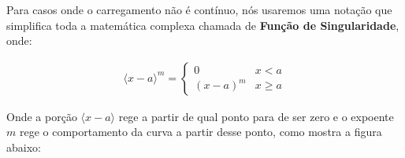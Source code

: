 \documentclass{article}
\begin{document}
            Para casos onde o carregamento não é contínuo, nós usaremos uma notação que simplifica toda a matemática complexa chamada de \textbf{Função de Singularidade}, onde:

            \begin{align}
                \langle x - a\rangle^m = \begin{cases}
                    0          & x<a \\ 
                    (x-a)^m    & x \ge a
                \end{cases}
                \label{eq:func_singularidade}
            \end{align}

            Onde a porção $\langle x - a \rangle$ rege a partir de qual ponto para de ser zero e o expoente $m$ rege o comportamento da curva a partir desse ponto, como mostra a figura abaixo:
\end{document}
